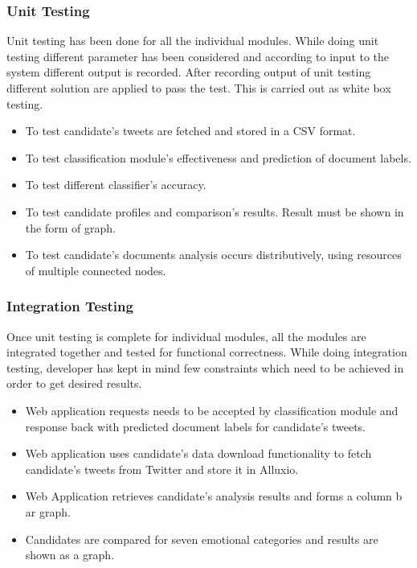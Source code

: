\documentclass[oneside,a4paper,12pt]{pictreport}
\begin{document}
\subsubsection{Unit Testing}
Unit testing has been done for all the individual modules. While doing unit testing different parameter has been considered and according to input to the system different output is recorded. After recording output of unit testing different solution are applied to pass the test. This is carried out as white box testing.
\begin{itemize}
\item To test candidate's tweets are fetched and stored in a CSV format.
\item To test classification module's effectiveness and prediction of document labels.
\item To test different classifier's accuracy.
\item To test candidate profiles and comparison's results. Result must be shown in the form of graph.
\item To test candidate's documents analysis occurs distributively, using resources of multiple connected nodes. 
\end{itemize}

\subsubsection{Integration Testing}
Once unit testing is complete for individual modules, all the modules are integrated together and tested for functional correctness. While doing integration testing, developer has kept in mind few constraints which need to be achieved in order to get desired results.
\begin{itemize}
\item Web application requests needs to be accepted by classification module and response back with predicted document labels for candidate's tweets.
\item Web application uses candidate's data download functionality to fetch candidate's tweets from Twitter and store it in Alluxio.
\item Web Application retrieves candidate's analysis results and forms a column b ar graph.
\item Candidates are compared for seven emotional categories and results are shown as a graph.
\end{itemize}
\end{document}
